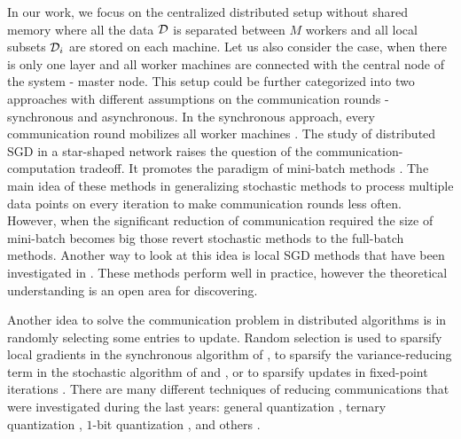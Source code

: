 In our work, we focus on the centralized distributed setup without shared memory \cite{mishchenko2018} where all the data $\mathcal{D}$ is separated between $M$ workers and all local subsets $\mathcal{D}_i$ are stored on each machine. {\color{blue}Let us also consider the case, when there is only one layer and all worker machines are connected with the central node of the system - master node. }This setup could be further categorized into two approaches with different assumptions on the communication rounds - synchronous and asynchronous. In the synchronous approach, every communication round mobilizes all worker machines \cite{BoydPCPE11,Chen2016,Tsianos12}. The study of distributed SGD in a star-shaped network \cite{yang2013trading} raises the question of the communication-computation tradeoff. It promotes the paradigm of mini-batch methods \cite{dekel2012optimal, shalev2013accelerated, shamir2014distributed, qu2016coordinate, takavc2015distributed}. The main idea of these methods in generalizing stochastic methods to process multiple data points on every iteration to make communication rounds less often. However, when the significant reduction of communication required the size of mini-batch becomes big those revert stochastic methods to the full-batch methods. Another way to look at this idea is local SGD methods that have been investigated in \cite{stich2018local,khaled2019first,khaled2020tighter,li2019federated,ma2017distributed}. These methods perform well in practice, however the theoretical understanding is an open area for discovering.

Another idea to solve the communication problem in distributed algorithms is in randomly selecting some entries to update. Random selection is used to sparsify local gradients in the synchronous algorithm of \cite{wangni2018gradient}, to sparsify the variance-reducing term in the stochastic algorithm of \cite{leblond2016asaga} and \cite{pedregosa2017breaking}, or to sparsify updates in fixed-point iterations \cite{peng2016arock}. There are many different techniques of reducing communications that were investigated during the last years:  general quantization \cite{alistarh2017qsgd, horvath2019stochastic, koloskova2019decentralized}, ternary quantization \cite{wen2017terngrad}, $1$-bit quantization \cite{bernstein2018signsgd}, and others \cite{ben2019demystifying, lin2017deep}.



